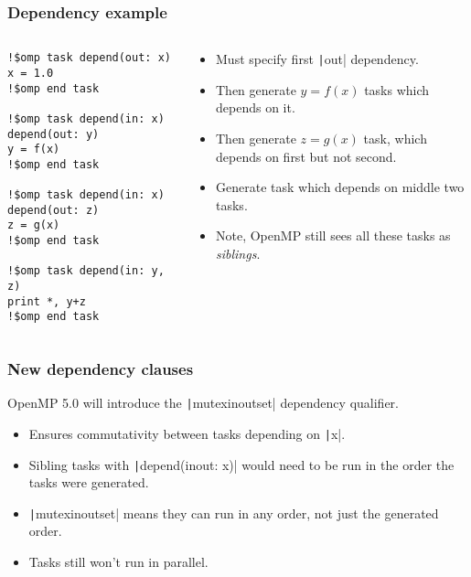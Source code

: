 \documentclass{beamer}
\begin{document}
\begin{frame}[fragile]
\frametitle{Dependency example}
\begin{columns}
\begin{column}{0.5\textwidth}
\begin{verbatim}
!$omp task depend(out: x)
x = 1.0
!$omp end task

!$omp task depend(in: x) depend(out: y)
y = f(x)
!$omp end task

!$omp task depend(in: x) depend(out: z)
z = g(x)
!$omp end task

!$omp task depend(in: y, z)
print *, y+z
!$omp end task
\end{verbatim}
\end{column}

\begin{column}{0.5\textwidth}
\begin{itemize}
  \item Must specify first \texttt|out| dependency.
  \item Then generate $y=f(x)$ tasks which depends on it.
  \item Then generate $z=g(x)$ task, which depends on first but not second.
  \item Generate task which depends on middle two tasks.
  \item Note, OpenMP still sees all these tasks as \emph{siblings}.
\end{itemize}
\end{column}
\end{columns}

\end{frame}

\begin{frame}
\frametitle{New dependency clauses}
OpenMP 5.0 will introduce the \texttt|mutexinoutset| dependency qualifier.
\begin{itemize}
  \item Ensures commutativity between tasks depending on \texttt|x|.
  \item Sibling tasks with \texttt|depend(inout: x)| would need to be run in the order the tasks were generated.
  \item \texttt|mutexinoutset| means they can run in any order, not just the generated order.
  \item Tasks still won't run in parallel.
\end{itemize}
\end{frame}
\end{document}
